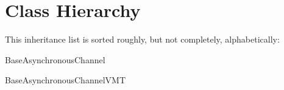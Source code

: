 \section{Class Hierarchy}
This inheritance list is sorted roughly, but not completely, alphabetically\+:\begin{DoxyCompactList}
\item Base\+Asynchronous\+Channel\begin{DoxyCompactList}
\item {}
\end{DoxyCompactList}
\item Base\+Asynchronous\+Channel\+V\+MT\begin{DoxyCompactList}
\item {}
\end{DoxyCompactList}
\item {}
\item {}
\item {}
\end{DoxyCompactList}
